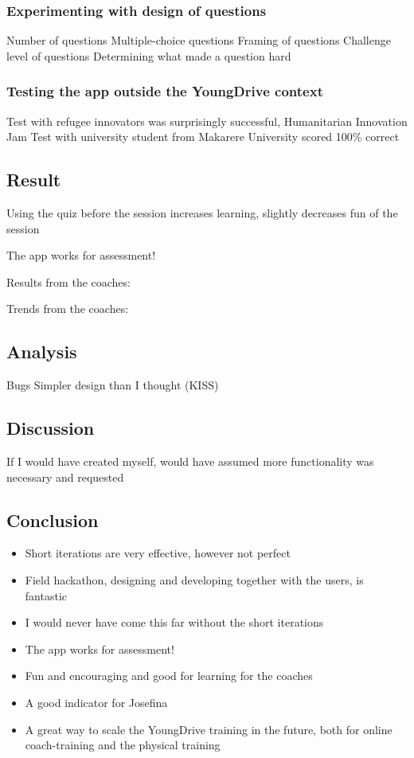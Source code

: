 \subsubsection{Experimenting with design of questions}
Number of questions
Multiple-choice questions
Framing of questions
Challenge level of questions
Determining what made a question hard

\subsubsection{Testing the app outside the YoungDrive context}
Test with refugee innovators was surprisingly successful, Humanitarian Innovation Jam
Test with university student from Makarere University scored 100\% correct

\subsection*{Result}
Using the quiz before the session increases learning, slightly decreases fun of the session

The app works for assessment!

Results from the coaches:

Trends from the coaches:

\subsection*{Analysis}
Bugs
Simpler design than I thought (KISS)

\subsection*{Discussion}
If I would have created myself, would have assumed more functionality was necessary and requested

\subsection*{Conclusion}
\begin{itemize}
\item Short iterations are very effective, however not perfect
\item Field hackathon, designing and developing together with the users, is fantastic
\item I would never have come this far without the short iterations
\item The app works for assessment!
\item Fun and encouraging and good for learning for the coaches
\item A good indicator for Josefina
\item A great way to scale the YoungDrive training in the future, both for online coach-training and the physical training
\end{itemize}

